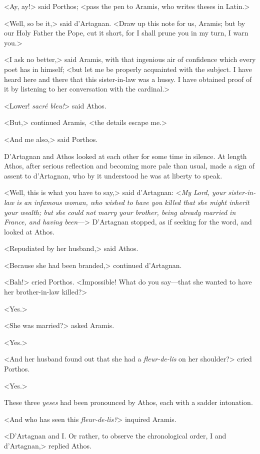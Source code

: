<Ay, ay!> said Porthos; <pass the pen to Aramis, who writes theses in Latin.> 

<Well, so be it,> said d'Artagnan. <Draw up this note for us, Aramis; but by our Holy Father the Pope, cut it short, for I shall prune you in my turn, I warn you.> 

<I ask no better,> said Aramis, with that ingenious air of confidence which every poet has in himself; <but let me be properly acquainted with the subject. I have heard here and there that this sister-in-law was a hussy. I have obtained proof of it by listening to her conversation with the cardinal.> 

<Lower! \textit{sacré bleu!}> said Athos. 

<But,> continued Aramis, <the details escape me.> 

<And me also,> said Porthos. 

D'Artagnan and Athos looked at each other for some time in silence. At length Athos, after serious reflection and becoming more pale than usual, made a sign of assent to d'Artagnan, who by it understood he was at liberty to speak. 

<Well, this is what you have to say,> said d'Artagnan: <\textit{My Lord, your sister-in-law is an infamous woman, who wished to have you killed that she might inherit your wealth; but she could not marry your brother, being already married in France, and having been}---> D'Artagnan stopped, as if seeking for the word, and looked at Athos. 

<Repudiated by her husband,> said Athos. 

<Because she had been branded,> continued d'Artagnan. 

<Bah!> cried Porthos. <Impossible! What do you say---that she wanted to have her brother-in-law killed?> 

<Yes.> 

<She was married?> asked Aramis. 

<Yes.> 

<And her husband found out that she had a \textit{fleur-de-lis} on her shoulder?> cried Porthos. 

<Yes.> 

These three \textit{yeses} had been pronounced by Athos, each with a sadder intonation. 

<And who has seen this \textit{fleur-de-lis?}> inquired Aramis. 

<D'Artagnan and I. Or rather, to observe the chronological order, I and d'Artagnan,> replied Athos. 

